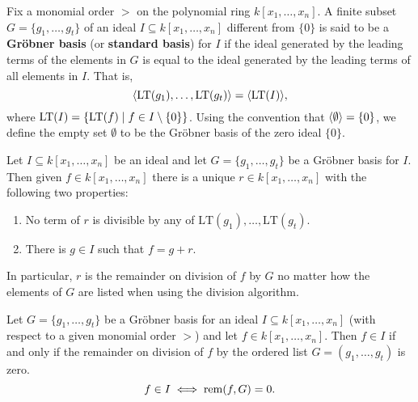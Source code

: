 \begin{definition}\label{def:Groebner_basis}
    \leanok %
    Fix a monomial order $>$ on the polynomial ring $k[x_1, \dots, x_n]$. 
    A finite subset $G = \{g_1, \dots, g_t\}$ of an ideal $I \subseteq k[x_1, \dots, x_n]$ different from $\{0\}$ 
    is said to be a \textbf{Gr{\"o}bner basis} (or \textbf{standard basis}) for $I$ if the ideal generated by the
    leading terms of the elements in $G$ is equal to the ideal generated by the leading terms of all elements in $I$.
    That is,
    \[ \langle \operatorname{LT}(g_1), \dots, \operatorname{LT}(g_t) \rangle = \langle \operatorname{LT}(I) \rangle, \]
    where $\operatorname{LT}(I) = \{\operatorname{LT}(f) \mid f \in I \setminus \{0\}\}$.
    Using the convention that $\langle \emptyset \rangle = \{0\}$, we define the empty set $\emptyset$
    to be the Gr{\"o}bner basis of the zero ideal $\{0\}$.
\end{definition}

\begin{proposition}\label{prop:GR_Unique_Remainder} %
    \leanok %
    Let $I \subseteq k[x_1,\dots,x_n]$ be an ideal and let $G = \{g_1,\dots,g_t\}$ be a Gr{\"o}bner basis for $I$.  
    Then given $f \in k[x_1,\dots,x_n]$ there is a unique $r \in k[x_1,\dots,x_n]$ with the following two properties:
    \begin{enumerate}
    \item No term of $r$ is divisible by any of 
      \(\mathrm{LT}(g_1),\dots,\mathrm{LT}(g_t)\).
    \item There is $g\in I$ such that $f = g + r$.
    \end{enumerate}
    In particular, $r$ is the remainder on division of $f$ by $G$ no matter how the elements of $G$ are listed when using the division algorithm.
\end{proposition}

\begin{corollary}\label{cor:GB_membership_test} %
    Let $G = \{g_1, \dots , g_t\}$ be a Gr{\"o}bner basis for an ideal $I \subseteq k[x_1, \dots , x_n]$
    (with respect to a given monomial order $>$) and let $f \in k[x_1, \dots , x_n]$.
    Then $f \in I$ if and only if the remainder on division of $f$ by the ordered list
    $G = (g_1, \dots, g_t)$ is zero.
    \[ f \in I \iff \operatorname{rem}(f, G) = 0. \]
\end{corollary}

